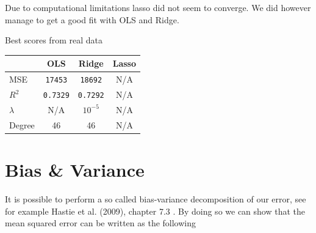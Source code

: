 \documentclass[twoside,11pt]{report}
\begin{document}
    Due to computational limitations lasso did not seem to converge. We did however manage to get a 
    good fit with OLS and Ridge. 
\begin{mytable}[float=!h,label=tab:realscores, width=0.7\textwidth]{Best scores from real data}
\centering
\begin{tabular}{l|c|c|c}
    & OLS & Ridge & Lasso \\
    \hline
    MSE  &   \texttt{17453} & \texttt{18692} & N/A \\
    $R^2$     &   \texttt{0.7329} & \texttt{0.7292} & N/A \\
    $\lambda$ &  N/A  & $10^{-5}$ & N/A \\
    Degree & 46 & 46 & N/A
\end{tabular}%
\end{mytable}


\section{Bias \& Variance}
\label{sec:biasvariance}

It is possible to perform a so called bias-variance decomposition of our error, 
see for example Hastie et al. (2009), chapter 7.3 \cite{hastie01statisticallearning}.
By doing so we can show that the mean squared error can be written as the following
\end{document}
